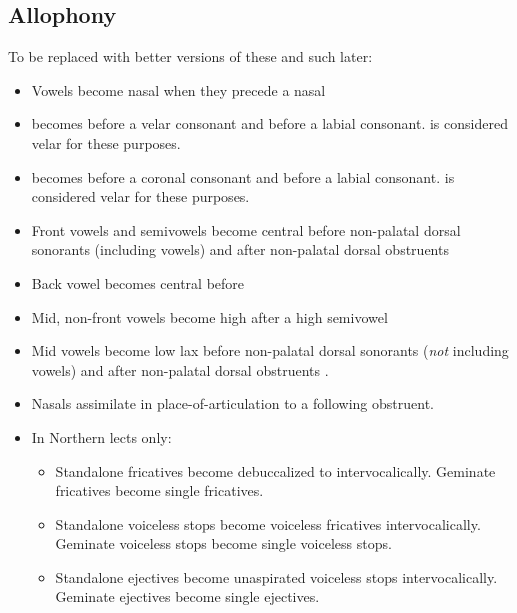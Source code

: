 \subsection{Allophony}

To be replaced with better versions of these and such later:

\begin{itemize}
    \item Vowels  become nasal  when they precede a nasal
    \item {} becomes \bripa{\vell} before a velar consonant and \bripa{\bilav\dwnwrd} before a labial consonant.  is considered velar for these purposes.
    \item \phipa{\vell} becomes \bripa{\darkl} before a coronal consonant and  before a labial consonant.  is considered velar for these purposes.
    \item Front vowels and semivowels  become central  before non-palatal dorsal sonorants (including vowels)  and after non-palatal dorsal obstruents 
    \item Back vowel  becomes central \bripa{\sche} before 
    \item Mid, non-front vowels  become high  after a high semivowel 
    \item Mid vowels  become low lax  before non-palatal dorsal sonorants (\emph{not} including vowels)  and after non-palatal dorsal obstruents .
    \item Nasals assimilate in place-of-articulation to a following obstruent.
    \item In Northern lects only:
    \begin{itemize}
        \item Standalone fricatives become debuccalized to  intervocalically. Geminate fricatives become single fricatives.
        \item Standalone voiceless stops become voiceless fricatives intervocalically. Geminate voiceless stops become single voiceless stops.
        \item Standalone ejectives become unaspirated voiceless stops intervocalically. Geminate ejectives become single ejectives.

\end{itemize}
\end{itemize}
